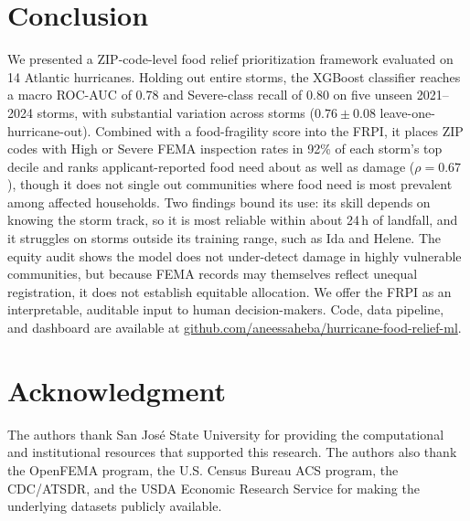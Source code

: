 \documentclass[conference]{IEEEtran}
\renewcommand{\_}{\origunderscore\allowbreak}
\begin{document}
\section{Conclusion}
\label{sec:conclusion}

We presented a ZIP-code-level food relief prioritization
framework evaluated on 14 Atlantic hurricanes. Holding out entire
storms, the XGBoost classifier reaches a macro ROC-AUC of 0.78 and
Severe-class recall of 0.80 on five unseen 2021--2024 storms,
with substantial variation across storms ($0.76\pm0.08$
leave-one-hurricane-out). Combined with a food-fragility score
into the FRPI, it places ZIP codes with High or Severe FEMA inspection rates in
92\% of each storm's top decile and ranks applicant-reported food
need about as well as damage ($\rho=0.67$), though it does not single
out communities where food need is most prevalent among affected
households. Two findings bound its use: its skill depends on knowing the storm
track, so it is most reliable within about 24\,h of landfall, and
it struggles on storms outside its training range, such as Ida and
Helene. The equity audit
shows the model does not under-detect damage in highly vulnerable
communities, but because FEMA records may themselves reflect
unequal registration, it does not establish equitable allocation.
We offer the FRPI as an interpretable, auditable input to human
decision-makers. Code, data pipeline, and dashboard are available
at \url{github.com/aneessaheba/hurricane-food-relief-ml}.

\section*{Acknowledgment}
The authors thank San Jos\'{e} State University for providing
the computational and institutional resources that supported
this research. The authors also thank the OpenFEMA program,
the U.S. Census Bureau ACS program, the CDC/ATSDR, and the
USDA Economic Research Service for making the underlying
datasets publicly available.
\end{document}
